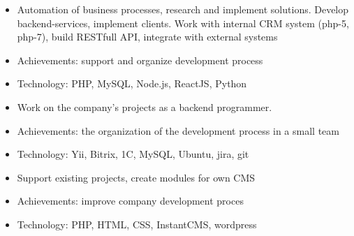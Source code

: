 \documentclass[10pt,a4paper]{altacv}
\begin{document}

\begin{fullwidth}
\makecvheader
\end{fullwidth}


\begin{itemize}
\item Automation of business processes, research and implement solutions. Develop backend-services, implement clients. Work with internal CRM system (php-5, php-7), build RESTfull API, integrate with external systems
\item Achievements: support and organize development process
\item Technology: PHP, MySQL, Node.js, ReactJS, Python
\end{itemize}

\divider

\begin{itemize}
\item Work on the company's projects as a backend programmer.
\item Achievements: the organization of the development process in a small team
\item Technology: Yii, Bitrix, 1C, MySQL, Ubuntu, jira, git
\end{itemize}

\divider

\begin{itemize}
\item Support existing projects, create modules for own CMS
\item Achievements: improve company development proces
\item Technology: PHP, HTML, CSS, InstantCMS, wordpress
\end{itemize}

\divider

\clearpage
\end{document}
